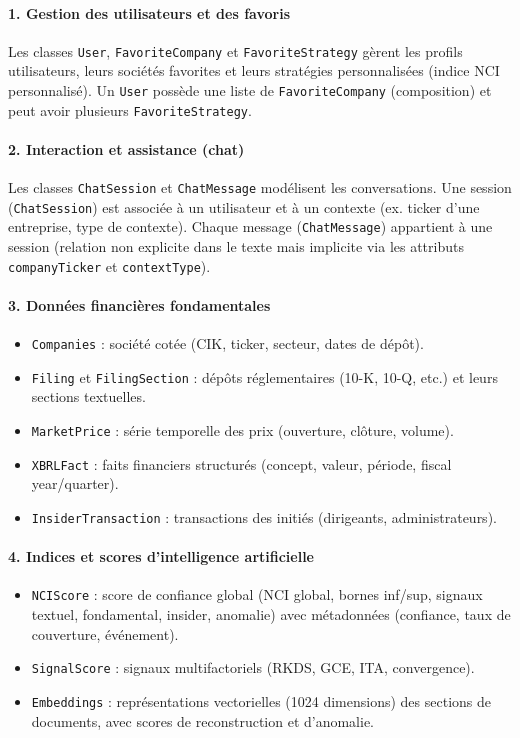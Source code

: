 \paragraph{1. Gestion des utilisateurs et des favoris}
Les classes \texttt{User}, \texttt{FavoriteCompany} et \texttt{FavoriteStrategy} gèrent les profils utilisateurs, leurs sociétés favorites et leurs stratégies personnalisées (indice NCI personnalisé). Un \texttt{User} possède une liste de \texttt{FavoriteCompany} (composition) et peut avoir plusieurs \texttt{FavoriteStrategy}.

\paragraph{2. Interaction et assistance (chat)}
Les classes \texttt{ChatSession} et \texttt{ChatMessage} modélisent les conversations. Une session (\texttt{ChatSession}) est associée à un utilisateur et à un contexte (ex. ticker d’une entreprise, type de contexte). Chaque message (\texttt{ChatMessage}) appartient à une session (relation non explicite dans le texte mais implicite via les attributs \texttt{companyTicker} et \texttt{contextType}).

\paragraph{3. Données financières fondamentales}
\vspace{-0.2cm}
\begin{itemize}
    \item \texttt{Companies} : société cotée (CIK, ticker, secteur, dates de dépôt).
    \item \texttt{Filing} et \texttt{FilingSection} : dépôts réglementaires (10-K, 10-Q, etc.) et leurs sections textuelles.
    \item \texttt{MarketPrice} : série temporelle des prix (ouverture, clôture, volume).
    \item \texttt{XBRLFact} : faits financiers structurés (concept, valeur, période, fiscal year/quarter).
    \item \texttt{InsiderTransaction} : transactions des initiés (dirigeants, administrateurs).
\end{itemize}

\paragraph{4. Indices et scores d’intelligence artificielle}
\vspace{-0.2cm}
\begin{itemize}
    \item \texttt{NCIScore} : score de confiance global (NCI global, bornes inf/sup, signaux textuel, fondamental, insider, anomalie) avec métadonnées (confiance, taux de couverture, événement).
    \item \texttt{SignalScore} : signaux multifactoriels (RKDS, GCE, ITA, convergence).
    \item \texttt{Embeddings} : représentations vectorielles (1024 dimensions) des sections de documents, avec scores de reconstruction et d’anomalie.
\end{itemize}

